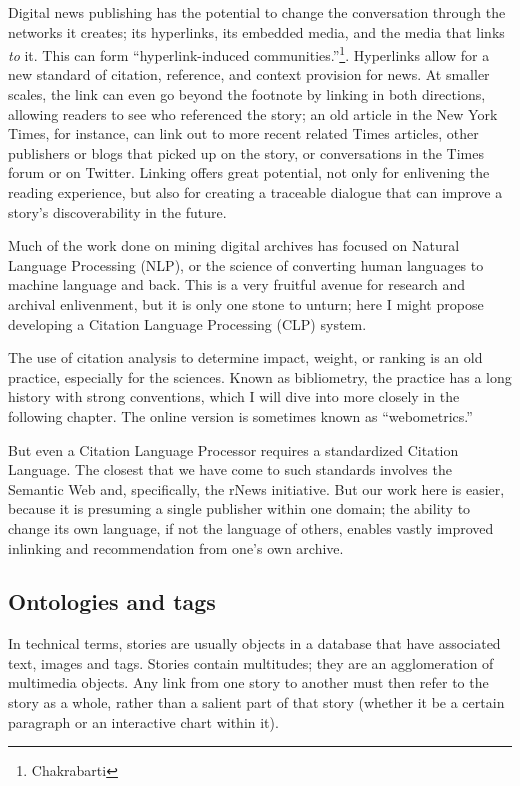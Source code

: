 Digital news publishing has the potential to change the conversation through the networks it creates; its hyperlinks, its embedded media, and the media that links \emph{to} it. This can form ``hyperlink-induced communities.''\footnote{Chakrabarti}. Hyperlinks allow for a new standard of citation, reference, and context provision for news. At smaller scales, the link can even go beyond the footnote by linking in both directions, allowing readers to see who referenced the story; an old article in the New York Times, for instance, can link out to more recent related Times articles, other publishers or blogs that picked up on the story, or conversations in the Times forum or on Twitter. Linking offers great potential, not only for enlivening the reading experience, but also for creating a traceable dialogue that can improve a story's discoverability in the future.

Much of the work done on mining digital archives has focused on Natural Language Processing (NLP), or the science of converting human languages to machine language and back. This is a very fruitful avenue for research and archival enlivenment, but it is only one stone to unturn; here I might propose developing a Citation Language Processing (CLP) system.

The use of citation analysis to determine impact, weight, or ranking is an old practice, especially for the sciences. Known as bibliometry, the practice has a long history with strong conventions, which I will dive into more closely in the following chapter. The online version is sometimes known as ``webometrics.''

But even a Citation Language Processor requires a standardized Citation Language. The closest that we have come to such standards involves the Semantic Web and, specifically, the rNews initiative. But our work here is easier, because it is presuming a single publisher within one domain; the ability to change its own language, if not the language of others, enables vastly improved inlinking and recommendation from one's own archive.

\subsection{Ontologies and tags}

In technical terms, stories are usually objects in a database that have associated text, images and tags. Stories contain multitudes; they are an agglomeration of multimedia objects. Any link from one story to another must then refer to the story as a whole, rather than a salient part of that story (whether it be a certain paragraph or an interactive chart within it).

